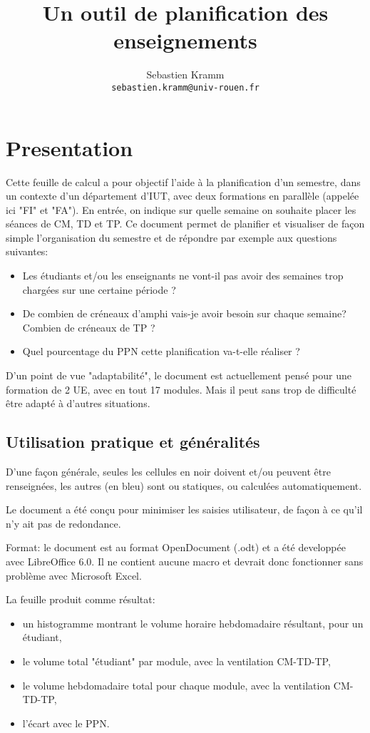 \documentclass[12pt,a4paper]{article}
\author{Sebastien Kramm\\{\tt sebastien.kramm@univ-rouen.fr}}
\title{Un outil de planification des enseignements}
\begin{document}
\maketitle

\section{Presentation}

Cette feuille de calcul a pour objectif l'aide à la planification d'un semestre, dans un contexte d'un département d'IUT, avec deux formations en parallèle (appelée ici "FI" et "FA").
En entrée, on indique sur quelle semaine on souhaite placer les séances de CM, TD et TP.
Ce document permet de planifier et visualiser de façon simple l'organisation du semestre et de répondre par exemple aux questions suivantes:

\begin{itemize}
\item Les étudiants et/ou les enseignants ne vont-il pas avoir des semaines trop chargées sur une certaine période ?
\item De combien de créneaux d'amphi vais-je avoir besoin sur chaque semaine?
Combien de créneaux de TP ?
\item Quel pourcentage du PPN cette planification va-t-elle réaliser ?
\end{itemize}

D'un point de vue "adaptabilité", le document est actuellement pensé pour une formation de 2 UE, avec en tout 17 modules.
Mais il peut sans trop de difficulté être adapté à d'autres situations.

\subsection{Utilisation pratique et généralités}


D'une façon générale, seules les cellules en noir doivent et/ou peuvent être renseignées, les autres (en bleu) sont ou statiques, ou calculées automatiquement.

Le document a été conçu pour minimiser les saisies utilisateur, de façon à ce qu'il n'y ait pas de redondance.

Format: le document est au format OpenDocument (.odt) et a été developpée avec LibreOffice 6.0.
Il ne contient aucune macro et devrait donc fonctionner sans problème avec Microsoft Excel.

La feuille produit comme résultat:
\begin{itemize}
\item un histogramme montrant le volume horaire hebdomadaire résultant, pour un étudiant,
\item le volume total "étudiant" par module, avec la ventilation CM-TD-TP,
\item le volume hebdomadaire total pour chaque module, avec la ventilation CM-TD-TP,
\item l'écart avec le PPN.
\end{itemize}
\end{document}
